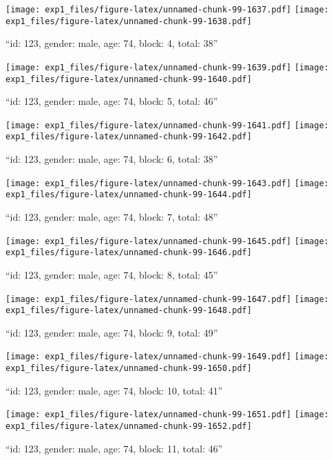 \documentclass[,]{article}
\begin{document}
\texttt{[image: exp1\_files/figure-latex/unnamed-chunk-99-1637.pdf]}
\texttt{[image: exp1\_files/figure-latex/unnamed-chunk-99-1638.pdf]}

\newpage
[1] 

``id: 123, gender: male, age: 74, block: 4, total: 38''

\texttt{[image: exp1\_files/figure-latex/unnamed-chunk-99-1639.pdf]}
\texttt{[image: exp1\_files/figure-latex/unnamed-chunk-99-1640.pdf]}

\newpage
[1] 

``id: 123, gender: male, age: 74, block: 5, total: 46''

\texttt{[image: exp1\_files/figure-latex/unnamed-chunk-99-1641.pdf]}
\texttt{[image: exp1\_files/figure-latex/unnamed-chunk-99-1642.pdf]}

\newpage
[1] 

``id: 123, gender: male, age: 74, block: 6, total: 38''

\texttt{[image: exp1\_files/figure-latex/unnamed-chunk-99-1643.pdf]}
\texttt{[image: exp1\_files/figure-latex/unnamed-chunk-99-1644.pdf]}

\newpage
[1] 

``id: 123, gender: male, age: 74, block: 7, total: 48''

\texttt{[image: exp1\_files/figure-latex/unnamed-chunk-99-1645.pdf]}
\texttt{[image: exp1\_files/figure-latex/unnamed-chunk-99-1646.pdf]}

\newpage
[1] 

``id: 123, gender: male, age: 74, block: 8, total: 45''

\texttt{[image: exp1\_files/figure-latex/unnamed-chunk-99-1647.pdf]}
\texttt{[image: exp1\_files/figure-latex/unnamed-chunk-99-1648.pdf]}

\newpage
[1] 

``id: 123, gender: male, age: 74, block: 9, total: 49''

\texttt{[image: exp1\_files/figure-latex/unnamed-chunk-99-1649.pdf]}
\texttt{[image: exp1\_files/figure-latex/unnamed-chunk-99-1650.pdf]}

\newpage
[1] 

``id: 123, gender: male, age: 74, block: 10, total: 41''

\texttt{[image: exp1\_files/figure-latex/unnamed-chunk-99-1651.pdf]}
\texttt{[image: exp1\_files/figure-latex/unnamed-chunk-99-1652.pdf]}

\newpage
[1] 

``id: 123, gender: male, age: 74, block: 11, total: 46''
\end{document}
